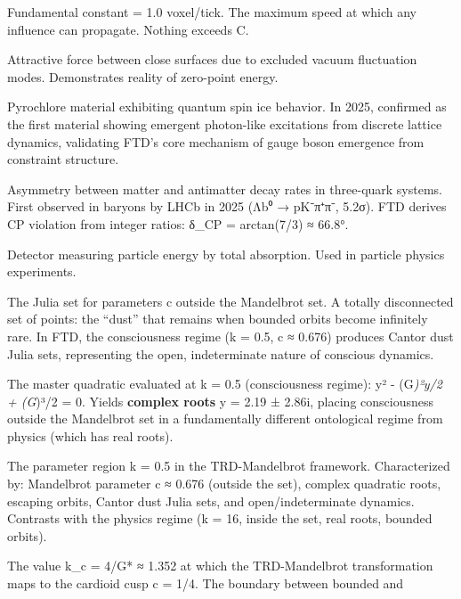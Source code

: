 \documentclass[
  11pt,
  letterpaper,
  twoside,
  openright]{book}
\providecommand{\tightlist}{%
  \setlength{\itemsep}{0pt}\setlength{\parskip}{0pt}}
\begin{document}
\begin{description}
\tightlist
\item[\textbf{C (Speed of Causality)}]
Fundamental constant = 1.0 voxel/tick. The maximum speed at which any
influence can propagate. Nothing exceeds C.
\item[\textbf{Casimir Effect}]
Attractive force between close surfaces due to excluded vacuum
fluctuation modes. Demonstrates reality of zero-point energy.
\item[\textbf{Ce₂Zr₂O₇ (Cerium Zirconium Oxide)}]
Pyrochlore material exhibiting quantum spin ice behavior. In 2025,
confirmed as the first material showing emergent photon-like excitations
from discrete lattice dynamics, validating FTD's core mechanism of gauge
boson emergence from constraint structure.
\item[\textbf{CP Violation (in Baryons)}]
Asymmetry between matter and antimatter decay rates in three-quark
systems. First observed in baryons by LHCb in 2025 (Λb⁰ → pK⁻π⁺π⁻,
5.2σ). FTD derives CP violation from integer ratios: δ\_CP = arctan(7/3)
≈ 66.8°.
\item[\textbf{Calorimeter}]
Detector measuring particle energy by total absorption. Used in particle
physics experiments.
\item[\textbf{Cantor Dust (Julia Set)}]
The Julia set for parameters c outside the Mandelbrot set. A totally
disconnected set of points: the ``dust'' that remains when bounded
orbits become infinitely rare. In FTD, the consciousness regime (k =
0.5, c ≈ 0.676) produces Cantor dust Julia sets, representing the open,
indeterminate nature of conscious dynamics.
\item[\textbf{Consciousness Quadratic}]
The master quadratic evaluated at k = 0.5 (consciousness regime): y² -
(G\emph{)²y/2 + (G})³/2 = 0. Yields \textbf{complex roots} y = 2.19 ±
2.86i, placing consciousness outside the Mandelbrot set in a
fundamentally different ontological regime from physics (which has real
roots).
\item[\textbf{Consciousness Regime}]
The parameter region k = 0.5 in the TRD-Mandelbrot framework.
Characterized by: Mandelbrot parameter c ≈ 0.676 (outside the set),
complex quadratic roots, escaping orbits, Cantor dust Julia sets, and
open/indeterminate dynamics. Contrasts with the physics regime (k = 16,
inside the set, real roots, bounded orbits).
\item[\textbf{Critical Coefficient (k\_c)}]
The value k\_c = 4/G* ≈ 1.352 at which the TRD-Mandelbrot transformation
maps to the cardioid cusp c = 1/4. The boundary between bounded and

\end{description}
\end{document}
